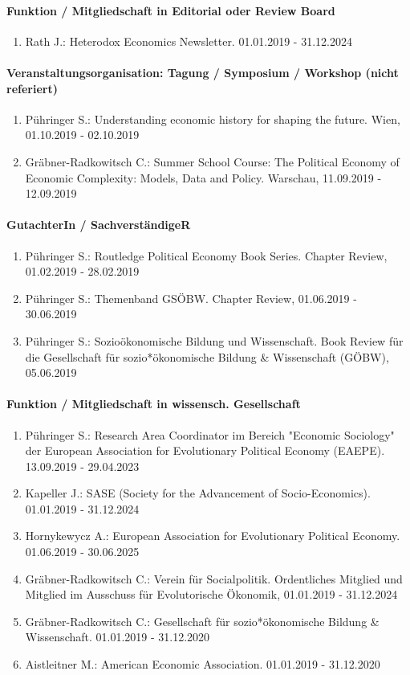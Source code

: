 \paragraph{Funktion / Mitgliedschaft in Editorial oder Review Board}
\begin{enumerate}[leftmargin=*, labelsep=0.5cm]
\item Rath J.: Heterodox Economics Newsletter. 01.01.2019 - 31.12.2024
\end{enumerate}
\paragraph{Veranstaltungsorganisation: Tagung / Symposium / Workshop (nicht referiert)}
\begin{enumerate}[leftmargin=*, labelsep=0.5cm]
\item Pühringer S.: Understanding economic history for shaping the future. Wien, 01.10.2019 - 02.10.2019
\item Gräbner-Radkowitsch C.: Summer School Course: The Political Economy of Economic Complexity: Models, Data and Policy. Warschau, 11.09.2019 - 12.09.2019
\end{enumerate}
\paragraph{GutachterIn / SachverständigeR}
\begin{enumerate}[leftmargin=*, labelsep=0.5cm]
\item Pühringer S.: Routledge Political Economy Book Series. Chapter Review, 01.02.2019 - 28.02.2019
\item Pühringer S.: Themenband GSÖBW. Chapter Review, 01.06.2019 - 30.06.2019
\item Pühringer S.: Sozioökonomische Bildung und Wissenschaft. Book Review für die Gesellschaft für sozio*ökonomische Bildung & Wissenschaft (GÖBW), 05.06.2019
\end{enumerate}
\paragraph{Funktion / Mitgliedschaft in wissensch. Gesellschaft}
\begin{enumerate}[leftmargin=*, labelsep=0.5cm]
\item Pühringer S.: Research Area Coordinator im Bereich "Economic Sociology" der European Association for Evolutionary Political Economy (EAEPE). 13.09.2019 - 29.04.2023
\item Kapeller J.: SASE (Society for the Advancement of Socio-Economics). 01.01.2019 - 31.12.2024
\item Hornykewycz A.: European Association for Evolutionary Political Economy. 01.06.2019 - 30.06.2025
\item Gräbner-Radkowitsch C.: Verein für Socialpolitik. Ordentliches Mitglied und Mitglied im Ausschuss für Evolutorische Ökonomik, 01.01.2019 - 31.12.2024
\item Gräbner-Radkowitsch C.: Gesellschaft für sozio*ökonomische Bildung & Wissenschaft. 01.01.2019 - 31.12.2020
\item Aistleitner M.: American Economic Association. 01.01.2019 - 31.12.2020
\end{enumerate}
